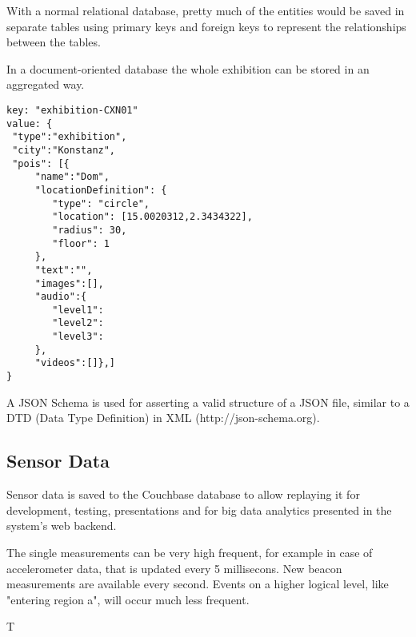 With a normal relational database, pretty much of the entities would be saved in separate tables using primary keys and foreign keys to represent the relationships between the tables.

In a document-oriented database the whole exhibition can be stored in an aggregated way. 

\begin{lstlisting}
key: "exhibition-CXN01"
value: {
 "type":"exhibition",
 "city":"Konstanz",
 "pois": [{
	 "name":"Dom", 
	 "locationDefinition": {
	 	"type": "circle",
	 	"location": [15.0020312,2.3434322],
	 	"radius": 30,
	 	"floor": 1
	 }, 
	 "text":"", 
	 "images":[], 
	 "audio":{
	 	"level1":
	 	"level2":
	 	"level3":
	 }, 
	 "videos":[]},]
}
\end{lstlisting}

A JSON Schema is used for asserting a valid structure of a JSON file, similar to a DTD (Data Type Definition) in XML (http://json-schema.org).

\subsection{Sensor Data}

Sensor data is saved to the Couchbase database to allow replaying it for development, testing, presentations and for big data analytics presented in the system's web backend. 

The single measurements can be very high frequent, for example in case of accelerometer data, that is updated every 5 millisecons. New beacon measurements are available every second. Events on a higher logical level, like "entering region a", will occur much less frequent.

T


